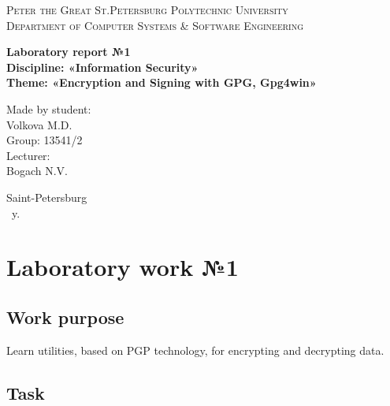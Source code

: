 \documentclass[14pt,a4paper,report]{report}
\begin{document}
\def\contentsname{Contents}

\begin{titlepage}
	\begin{center}
		\textsc{Peter the Great St.Petersburg Polytechnic University\\[5mm]
			Department of Computer Systems \& Software Engineering}
		
		\vfill
		
		\textbf{Laboratory report №1\\[3mm]
			Discipline: «Information Security»\\[3mm]
			Theme: «Encryption and Signing with GPG, Gpg4win»\\[41mm]
		}
	\end{center}
	
	\hfill
	\begin{minipage}{.4\textwidth}
		Made by student:\\[2mm] 
		Volkova M.D.\\
		Group: 13541/2\\[5mm]
		
		Lecturer:\\[2mm] 
		Bogach N.V.
	\end{minipage}
	\vfill
	\begin{center}
		Saint-Petersburg\\ \the\year\ y.
	\end{center}
\end{titlepage}

\tableofcontents
\clearpage

\chapter{Laboratory work №1}

\section{Work purpose}

Learn utilities, based on PGP technology, for encrypting and decrypting data.

\section{Task}
\end{document}
